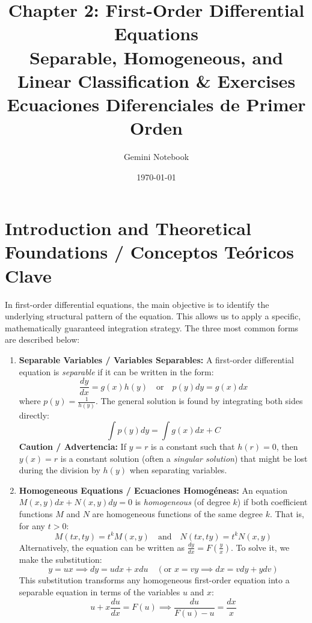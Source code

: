 \documentclass[11pt,letterpaper]{article}
\title{\textbf{Chapter 2: First-Order Differential Equations}\\
\large Separable, Homogeneous, and Linear Classification \& Exercises\\
\normalsity Ecuaciones Diferenciales de Primer Orden}
\author{Gemini Notebook}
\date{\today}
\begin{document}
\maketitle

\section{Introduction and Theoretical Foundations / Conceptos Teóricos Clave}

In first-order differential equations, the main objective is to identify the underlying structural pattern of the equation. This allows us to apply a specific, mathematically guaranteed integration strategy. The three most common forms are described below:

\begin{enumerate}
    \item \textbf{Separable Variables / Variables Separables:}
    A first-order differential equation is \textit{separable} if it can be written in the form:
    \begin{equation}
        \frac{dy}{dx} = g(x)h(y) \quad \text{or} \quad p(y)dy = g(x)dx
    \end{equation}
    where $p(y) = \frac{1}{h(y)}$. The general solution is found by integrating both sides directly:
    \begin{equation}
        \int p(y) dy = \int g(x) dx + C
    \end{equation}
    \textbf{Caution / Advertencia:} If $y = r$ is a constant such that $h(r) = 0$, then $y(x) = r$ is a constant solution (often a \textit{singular solution}) that might be lost during the division by $h(y)$ when separating variables.

    \item \textbf{Homogeneous Equations / Ecuaciones Homogéneas:}
    An equation $M(x,y)dx + N(x,y)dy = 0$ is \textit{homogeneous} (of degree $k$) if both coefficient functions $M$ and $N$ are homogeneous functions of the same degree $k$. That is, for any $t > 0$:
    \begin{equation}
        M(tx, ty) = t^k M(x,y) \quad \text{and} \quad N(tx, ty) = t^k N(x,y)
    \end{equation}
    Alternatively, the equation can be written as $\frac{dy}{dx} = F\left(\frac{y}{x}\right)$. 
    To solve it, we make the substitution:
    \begin{equation}
        y = ux \implies dy = u dx + x du \quad \left(\text{or } x = vy \implies dx = v dy + y dv\right)
    \end{equation}
    This substitution transforms any homogeneous first-order equation into a separable equation in terms of the variables $u$ and $x$:
    \begin{equation}
        u + x\frac{du}{dx} = F(u) \implies \frac{du}{F(u) - u} = \frac{dx}{x}
    \end{equation}


\end{enumerate}
\end{document}
